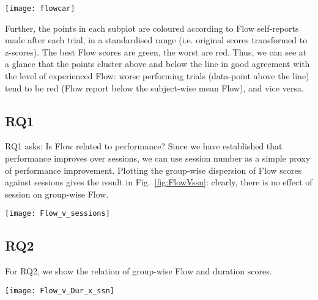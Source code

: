 \documentclass[fleqn,10pt]{wlscirep}
\newcommand{\nicewidth}{0.8\textwidth}
\begin{document}
\begin{figure*}[!ht]
	\centering
	\texttt{[image: flowcar]}
	\caption{Participant-wise data showing logarithm-transformed performance and Flow self-reports in a speeded steering task. Ordinate shows log-duration of trials, abscissa shows log-cumulative trial count. Dashed blue lines fitted to the data are `ideal' power-law learning curves, which transform to linear in log-log space.}
	\label{fig:flowcar}
\end{figure*}

Further, the points in each subplot are coloured according to Flow self-reports made after each trial, in a standardised range (i.e. original scores transformed to z-scores). The best Flow scores are green, the worst are red. Thus, we can see at a glance that the points cluster above and below the line in good agreement with the level of experienced Flow: worse performing trials (data-point above the line) tend to be red (Flow report below the subject-wise mean Flow), and vice versa.

\subsection*{RQ1}
RQ1 asks: Is Flow related to performance? Since we have established that performance improves over sessions, we can use session number as a simple proxy of performance improvement. Plotting the group-wise dispersion of Flow scores against sessions gives the result in Fig.~\ref{fig:FlowVssn}: clearly, there is no effect of session on group-wise Flow.

\begin{figure*}[!ht]
	\centering
	\texttt{[image: Flow\_v\_sessions]}
	\caption{Boxplot representing flow in sessions 1-8. The self-report scale was 1-7.}
	\label{fig:FlowVssn}
\end{figure*}



\subsection*{RQ2}
For RQ2, we show the relation of group-wise Flow and duration scores.

\begin{figure*}[!ht]
	\centering
	\texttt{[image: Flow\_v\_Dur\_x\_ssn]}
	\caption{Duration and Flow over sessions grouped: 1, 2-4 (training), 5-8 (physiological measurements), N = 72.}
	\label{fig:FlowVdurXssn}
\end{figure*}
\end{document}
